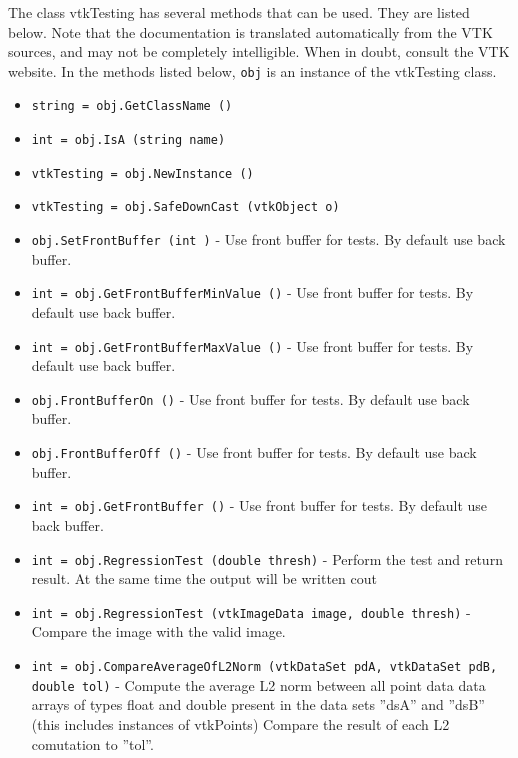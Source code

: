The class vtkTesting has several methods that can be used.
  They are listed below.
Note that the documentation is translated automatically from the VTK sources,
and may not be completely intelligible.  When in doubt, consult the VTK website.
In the methods listed below, \verb|obj| is an instance of the vtkTesting class.
\begin{itemize}
\item  \verb|string = obj.GetClassName ()|

\item  \verb|int = obj.IsA (string name)|

\item  \verb|vtkTesting = obj.NewInstance ()|

\item  \verb|vtkTesting = obj.SafeDownCast (vtkObject o)|

\item  \verb|obj.SetFrontBuffer (int )| -  Use front buffer for tests. By default use back buffer.

\item  \verb|int = obj.GetFrontBufferMinValue ()| -  Use front buffer for tests. By default use back buffer.

\item  \verb|int = obj.GetFrontBufferMaxValue ()| -  Use front buffer for tests. By default use back buffer.

\item  \verb|obj.FrontBufferOn ()| -  Use front buffer for tests. By default use back buffer.

\item  \verb|obj.FrontBufferOff ()| -  Use front buffer for tests. By default use back buffer.

\item  \verb|int = obj.GetFrontBuffer ()| -  Use front buffer for tests. By default use back buffer.

\item  \verb|int = obj.RegressionTest (double thresh)| -  Perform the test and return result. At the same time the output will be
 written cout

\item  \verb|int = obj.RegressionTest (vtkImageData image, double thresh)| -  Compare the image with the valid image.

\item  \verb|int = obj.CompareAverageOfL2Norm (vtkDataSet pdA, vtkDataSet pdB, double tol)| -  Compute the average L2 norm between all point data data arrays 
 of types float and double present in the data sets ''dsA'' and ''dsB''
 (this includes instances of vtkPoints) Compare the result of 
 each L2 comutation to ''tol''.


\end{itemize}

